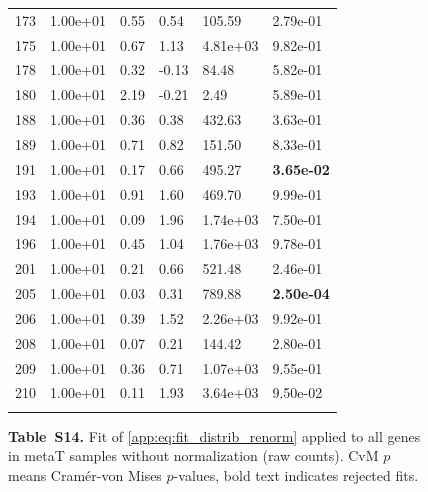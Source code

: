 \begin{figure}[htbp!]
{\begin{minipage}[t]{0.48\linewidth}
\begin{tabular}{llllll}
                    173 & 1.00e+01 & 0.55 & 0.54 & 105.59 & 2.79e-01\\
                    175 & 1.00e+01 & 0.67 & 1.13 & 4.81e+03 & 9.82e-01\\
                    178 & 1.00e+01 & 0.32 & -0.13 & 84.48 & 5.82e-01\\
                    180 & 1.00e+01 & 2.19 & -0.21 & 2.49 & 5.89e-01\\
                    188 & 1.00e+01 & 0.36 & 0.38 & 432.63 & 3.63e-01\\
                    189 & 1.00e+01 & 0.71 & 0.82 & 151.50 & 8.33e-01\\
                    191 & 1.00e+01 & 0.17 & 0.66 & 495.27 & \textbf{3.65e-02}\\
                    193 & 1.00e+01 & 0.91 & 1.60 & 469.70 & 9.99e-01\\
                    194 & 1.00e+01 & 0.09 & 1.96 & 1.74e+03 & 7.50e-01\\
                    196 & 1.00e+01 & 0.45 & 1.04 & 1.76e+03 & 9.78e-01\\
                    201 & 1.00e+01 & 0.21 & 0.66 & 521.48 & 2.46e-01\\
                    205 & 1.00e+01 & 0.03 & 0.31 & 789.88 & \textbf{2.50e-04}\\
                    206 & 1.00e+01 & 0.39 & 1.52 & 2.26e+03 & 9.92e-01\\
                    208 & 1.00e+01 & 0.07 & 0.21 & 144.42 & 2.80e-01\\
                    209 & 1.00e+01 & 0.36 & 0.71 & 1.07e+03 & 9.55e-01\\
                    210 & 1.00e+01 & 0.11 & 1.93 & 3.64e+03 & 9.50e-02\\
                     &  &  &  &  & \\
        \bottomrule
        \end{tabular}
    \end{minipage}
    }
    \caption*{\textbf{Table~S14.} Fit of \eqref{app:eq:fit_distrib_renorm} applied to all genes in metaT samples without normalization (raw counts). CvM $p$ means Cram\'er-von Mises $p$-values, bold text indicates rejected fits.}
    \label{subtab:app:all_raw:metaT}
\end{figure}